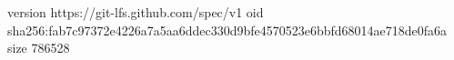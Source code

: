 version https://git-lfs.github.com/spec/v1
oid sha256:fab7c97372e4226a7a5aa6ddec330d9bfe4570523e6bbfd68014ae718de0fa6a
size 786528
